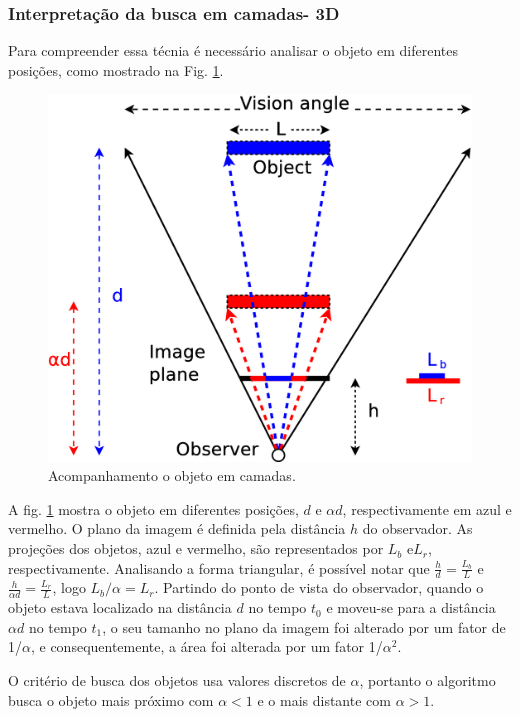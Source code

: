 

\subsubsection{Interpretação da busca em camadas- 3D}

Para compreender essa técnia é necessário analisar o objeto 
em diferentes posições, como mostrado na Fig. \ref{fig:multiscale3d}.

\begin{figure}[H]
\centering
  \includegraphics[width=.7\columnwidth]{images/Diagrama3.eps}
  \caption{ Acompanhamento o objeto em camadas.}
  \label{fig:multiscale3d}
\end{figure}

A fig. \ref{fig:multiscale3d} mostra o objeto em diferentes posições, 
$d$ e $\alpha d$, respectivamente em azul e vermelho.
O plano da imagem é definida pela distância $h$ do observador. As projeções dos objetos,
azul e vermelho, são representados por $L_b$ e$L_r$, respectivamente. Analisando a forma
triangular, é possível notar que $\frac{h}{d}=\frac{L_b}{L}$ e $\frac{h}{\alpha d}=\frac{L_r}{L}$, logo 
$L_b/\alpha= L_r$. 
Partindo do ponto de vista do observador, quando o objeto estava localizado na distância $d$ no tempo
$t_0$ e moveu-se para a distância $\alpha d$ no tempo $t_1$, o seu tamanho no plano da imagem 
foi alterado por um fator de 1/$\alpha$, e consequentemente, a área foi alterada por um fator 1/$\alpha^2$.

O critério de busca dos objetos usa valores discretos de $\alpha$, portanto o algoritmo busca o objeto
mais próximo com $\alpha<1$ e o mais distante com $\alpha>1$.



